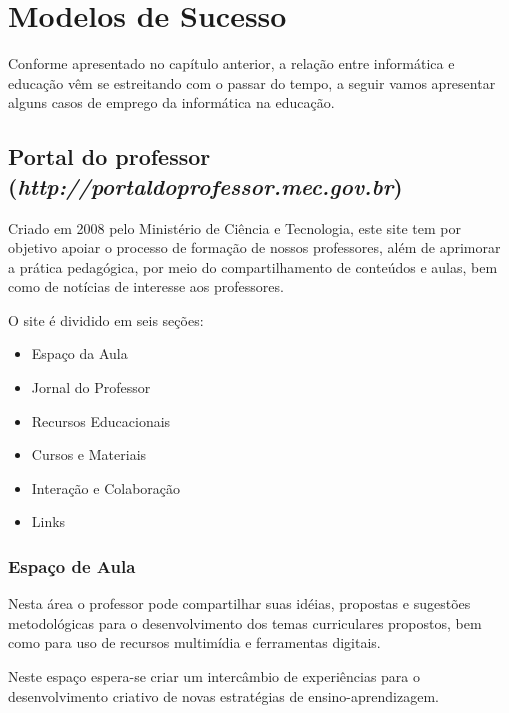 \chapter{Modelos de Sucesso}
\label{ch:modelo_sucesso}
Conforme apresentado no capítulo anterior, a relação entre informática e
educação vêm se estreitando com o passar do tempo, a seguir vamos apresentar
alguns casos de emprego da informática na educação.

    \section{Portal do professor
            \\(\emph{http://portaldoprofessor.mec.gov.br})}
    Criado em 2008 pelo Ministério de Ciência e Tecnologia, este site tem
    por objetivo apoiar o processo de formação de nossos professores, além
    de aprimorar a prática pedagógica, por meio do compartilhamento de
    conteúdos e aulas, bem como de notícias de interesse aos professores.

    O site é dividido em seis seções:

    \begin{itemize}

        \item Espaço da Aula

        \item Jornal do Professor

        \item Recursos Educacionais

        \item Cursos e Materiais

        \item Interação e Colaboração

        \item Links

    \end{itemize}

        \subsection{Espaço de Aula}
        Nesta área o professor pode compartilhar suas idéias, propostas e
        sugestões metodológicas para o desenvolvimento dos temas
        curriculares propostos, bem como para uso de recursos multimídia e
        ferramentas digitais.

        Neste espaço espera-se criar um intercâmbio de experiências para o
        desenvolvimento criativo de novas estratégias de ensino-aprendizagem.

